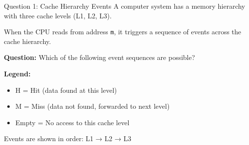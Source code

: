\documentclass[aspectratio=169,12pt]{beamer}
\begin{document}
\begin{frame}{Question 1: Cache Hierarchy Events}
A computer system has a memory hierarchy with three cache levels (L1, L2, L3).

When the CPU reads from address \texttt{m}, it triggers a sequence of events across the cache hierarchy.

\vspace{0.3cm}

\textbf{Question:} Which of the following event sequences are possible?

\vspace{0.3cm}
\small
\textbf{Legend:}
\begin{itemize}
    \item H = Hit (data found at this level)
    \item M = Miss (data not found, forwarded to next level)
    \item Empty = No access to this cache level
\end{itemize}

Events are shown in order: L1 → L2 → L3
\end{frame}
\end{document}
